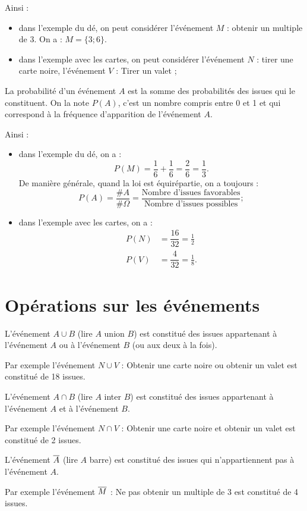 \documentclass[a4paper,11pt,DIV12,BCOR0mm]{scrartcl}
\begin{document}
Ainsi :
\begin{itemize}
 \item dans l'exemple du dé, on peut considérer l'événement $M$ : \og obtenir un multiple de 3\fg.
  On a : $M=\{3;6\}$.
 \item dans l'exemple avec les cartes, on peut considérer l'événement 
$N$ : \og tirer une carte noire\fg, l'événement $V$ : \og Tirer un valet \fg;
\end{itemize}

\begin{definition}
 La probabilité d'un événement $A$ est la somme des probabilités des issues 
qui le constituent. On la note $P(A)$, c'est un nombre compris entre 0 et 1
et qui correspond à la fréquence d'apparition de l'événement $A$.
\end{definition}

Ainsi :
\begin{itemize}
 \item dans l'exemple du dé, on a :
    \[
     P(M)=\frac16+\frac16=\frac26=\frac13.
    \]
  De manière générale, quand la loi est équirépartie, on a toujours :
    \[
     P(A)=\frac{\#A}{\#\Omega}
	 =\frac{\text{Nombre d'issues favorables}}{\text{Nombre d'issues possibles}};
    \]
 \item dans l'exemple avec les cartes, on a :
    \begin{align*}
     P(N)&=\dfrac{16}{32}=\frac12\\
     P(V)&=\dfrac{4}{32}=\frac18.
    \end{align*}
\end{itemize}
\pagebreak
\section{Opérations sur les événements}
\begin{definition}
 L'événement $A\cup B$ (lire $A$ union $B$) est constitué des issues appartenant à l'événement
$A$ ou à l'événement $B$ (ou aux deux à la fois).
\end{definition}
Par exemple l'événement $N\cup V$ : \og Obtenir une carte noire ou obtenir un valet\fg{}
est constitué de 18 issues.
\begin{definition}
 L'événement $A\cap B$ (lire $A$ inter $B$) est constitué des issues appartenant à l'événement
$A$ et à l'événement $B$.
\end{definition}
Par exemple l'événement $N\cap V$ : \og Obtenir une carte noire et obtenir un valet\fg{}
est constitué de 2 issues. 
\begin{definition}
 L'événement $\overline{A}$ (lire $A$ barre) est constitué des issues qui n'appartiennent
pas à l'événement $A$.
\end{definition}
Par exemple l'événement $\overline{M}$ : \og Ne pas obtenir un multiple de 3\fg{} est 
constitué de 4 issues.
\end{document}
